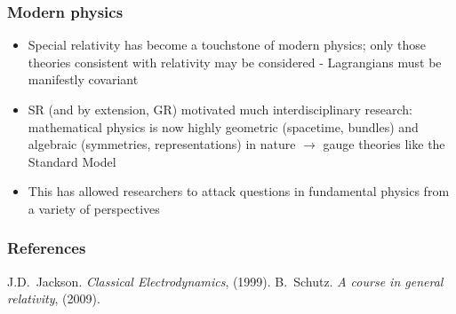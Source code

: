 \documentclass{beamer}
\begin{document}
\begin{frame}
    \frametitle{Modern physics}
    \begin{itemize}
        \item Special relativity has become a touchstone of modern physics; only those theories consistent
            with relativity may be considered - Lagrangians must be manifestly covariant
        \item SR (and by extension, GR) motivated much interdisciplinary research: mathematical physics is
            now highly geometric (spacetime, bundles) and algebraic (symmetries, representations) in nature
            $\to$ gauge theories like the Standard Model
        \item This has allowed researchers to attack questions in fundamental physics from a variety of perspectives
    \end{itemize}
\end{frame}

\begin{frame}
    \frametitle{References}
    \begin{thebibliography}
        \beamertemplatebookbibitems
         J.D.~Jackson. \textit{Classical Electrodynamics}, (1999).
         B.~Schutz. \textit{A course in general relativity}, (2009).
    \end{thebibliography}
\end{frame}
\end{document}
